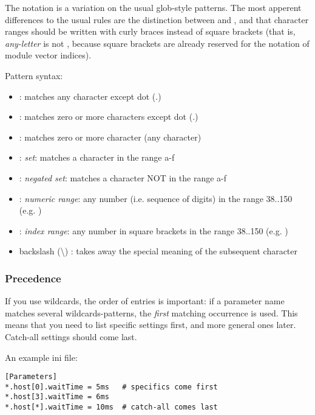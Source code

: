 The notation is a variation on the usual glob-style patterns.
The most apperent differences to the usual rules are the distinction between
\ttt{*} and \ttt{**}, and that character ranges should be written
with curly braces instead of square brackets (that is, \textit{any-letter}
is  not \ttt{[a-zA-Z]}, because square brackets are
already reserved for the notation of module vector indices).

Pattern syntax:

\begin{itemize}
  \item {} : matches any character except dot (.)
  \item \ttt{*} : matches zero or more characters except dot (.)
  \item \ttt{**} : matches zero or more character (any character)
  \item {} : \textit{set}: matches a character in the range a-f
  \item {}: \textit{negated set}: matches a character
    NOT in the range a-f
  \item {} : \textit{numeric range}: any number (i.e. sequence of digits)
    in the range 38..150  (e.g. )
  \item \ttt{[38..150]} : \textit{index range}: any number in square brackets in the
    range 38..150 (e.g. \ttt{[99]})
  \item backslash ({\textbackslash}) : takes away the special meaning of the
    subsequent character
\end{itemize}

\subsubsection{Precedence}

If you use wildcards, the order of entries is important: if a parameter
name matches several wildcards-patterns, the \textit{first} matching occurrence
is used. This means that you need to list specific settings first, and
more general ones later. Catch-all settings should come last.

An example ini file:

\begin{verbatim}
[Parameters]
*.host[0].waitTime = 5ms   # specifics come first
*.host[3].waitTime = 6ms
*.host[*].waitTime = 10ms  # catch-all comes last
\end{verbatim}


